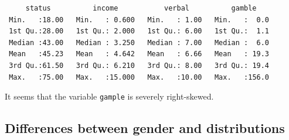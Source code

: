 \documentclass[
  12pt,
  a4paperpaper,
]{article}
\newenvironment{Shaded}{\begin{snugshade}}{\end{snugshade}}
\newcommand{\AttributeTok}[1]{\textcolor[rgb]{0.40,0.45,0.13}{#1}}
\newcommand{\FunctionTok}[1]{\textcolor[rgb]{0.28,0.35,0.67}{#1}}
\newcommand{\NormalTok}[1]{\textcolor[rgb]{0.00,0.23,0.31}{#1}}
\newcommand{\OtherTok}[1]{\textcolor[rgb]{0.00,0.23,0.31}{#1}}
\newcommand{\SpecialCharTok}[1]{\textcolor[rgb]{0.37,0.37,0.37}{#1}}
\newcommand{\StringTok}[1]{\textcolor[rgb]{0.13,0.47,0.30}{#1}}
\begin{document}
\begin{verbatim}
     status          income           verbal          gamble     
 Min.   :18.00   Min.   : 0.600   Min.   : 1.00   Min.   :  0.0  
 1st Qu.:28.00   1st Qu.: 2.000   1st Qu.: 6.00   1st Qu.:  1.1  
 Median :43.00   Median : 3.250   Median : 7.00   Median :  6.0  
 Mean   :45.23   Mean   : 4.642   Mean   : 6.66   Mean   : 19.3  
 3rd Qu.:61.50   3rd Qu.: 6.210   3rd Qu.: 8.00   3rd Qu.: 19.4  
 Max.   :75.00   Max.   :15.000   Max.   :10.00   Max.   :156.0  
\end{verbatim}

It seems that the variable \texttt{gample} is severely right-skewed.

\hypertarget{differences-between-gender-and-distributions}{%
\subsection{Differences between gender and
distributions}\label{differences-between-gender-and-distributions}}

\begin{Shaded}
\end{Shaded}
\end{document}
